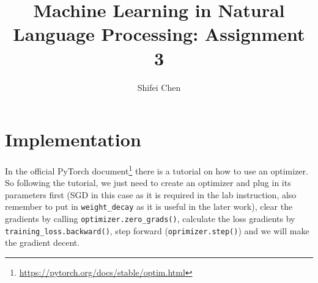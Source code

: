 \documentclass[11pt]{article} %
\title{{\LARGE Machine Learning in Natural Language Processing: \newline Assignment 3}\\[1.5mm]} %
\author{Shifei Chen} %
\begin{document}
\maketitle

\section{Implementation}
In the official PyTorch document\footnote{\url{https://pytorch.org/docs/stable/optim.html}} there is a tutorial on how to use an optimizer. So following the tutorial, we just need to create an optimizer and plug in its parameters first (SGD in this case as it is required in the lab instruction, also remember to put in \verb|weight_decay| as it is useful in the later work), clear the gradients by calling \verb|optimizer.zero_grads()|, calculate the loss gradients by \verb|training_loss.backward()|, step forward (\verb|oprimizer.step()|) and we will make the gradient decent.
\end{document}
